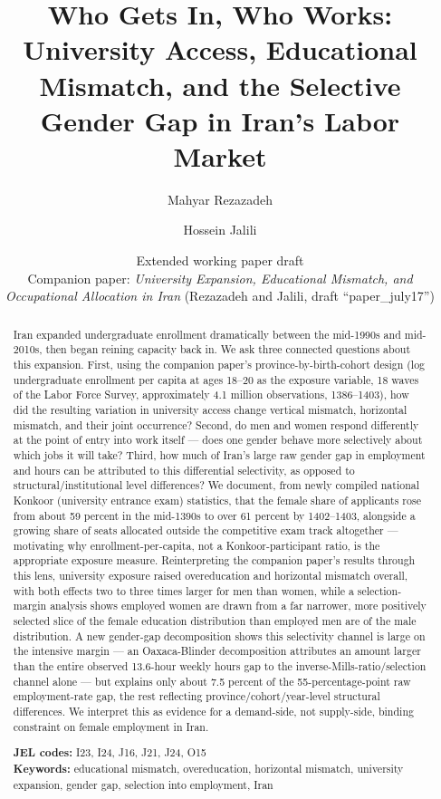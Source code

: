 \documentclass[11pt]{article}
\title{Who Gets In, Who Works: University Access, Educational Mismatch, and the Selective Gender Gap in Iran's Labor Market}
\author[1]{Mahyar Rezazadeh}
\author[2]{Hossein Jalili}
\affil[1,2]{Simon Fraser University}
\date{Extended working paper draft\\[2pt]
\small Companion paper: \emph{University Expansion, Educational Mismatch, and Occupational Allocation in Iran} (Rezazadeh and Jalili, draft ``paper\_july17'')}
\begin{document}
\maketitle

\begin{abstract}
\noindent Iran expanded undergraduate enrollment dramatically between the mid-1990s and mid-2010s, then began reining capacity back in. We ask three connected questions about this expansion. First, using the companion paper's province-by-birth-cohort design (log undergraduate enrollment per capita at ages 18--20 as the exposure variable, 18 waves of the Labor Force Survey, approximately 4.1 million observations, 1386--1403), how did the resulting variation in university access change vertical mismatch, horizontal mismatch, and their joint occurrence? Second, do men and women respond differently at the point of entry into work itself --- does one gender behave more selectively about which jobs it will take? Third, how much of Iran's large raw gender gap in employment and hours can be attributed to this differential selectivity, as opposed to structural/institutional level differences? We document, from newly compiled national Konkoor (university entrance exam) statistics, that the female share of applicants rose from about 59 percent in the mid-1390s to over 61 percent by 1402--1403, alongside a growing share of seats allocated outside the competitive exam track altogether --- motivating why enrollment-per-capita, not a Konkoor-participant ratio, is the appropriate exposure measure. Reinterpreting the companion paper's results through this lens, university exposure raised overeducation and horizontal mismatch overall, with both effects two to three times larger for men than women, while a selection-margin analysis shows employed women are drawn from a far narrower, more positively selected slice of the female education distribution than employed men are of the male distribution. A new gender-gap decomposition shows this selectivity channel is large on the intensive margin --- an Oaxaca-Blinder decomposition attributes an amount larger than the entire observed 13.6-hour weekly hours gap to the inverse-Mills-ratio/selection channel alone --- but explains only about 7.5 percent of the 55-percentage-point raw employment-rate gap, the rest reflecting province/cohort/year-level structural differences. We interpret this as evidence for a demand-side, not supply-side, binding constraint on female employment in Iran.

\vspace{6pt}
\noindent\textbf{JEL codes:} I23, I24, J16, J21, J24, O15\\
\textbf{Keywords:} educational mismatch, overeducation, horizontal mismatch, university expansion, gender gap, selection into employment, Iran
\end{abstract}
\end{document}
